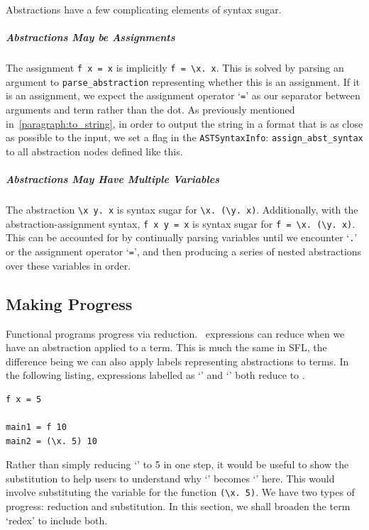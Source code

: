 \noindent Abstractions have a few complicating elements of syntax sugar.

\subparagraph{Abstractions May be Assignments}
The assignment \verb|f x = x| is implicitly \verb|f = \x. x|. This is solved by parsing an argument to \verb|parse_abstraction| representing whether this is an assignment. If it is an assignment, we expect the assignment operator `\verb|=|' as our separator between arguments and term rather than the dot. As previously mentioned in~\ref{paragraph:to_string}, in order to output the string in a format that is as close as possible to the input, we set a flag in the \verb|ASTSyntaxInfo|: \verb|assign_abst_syntax| to all abstraction nodes defined like this. 

\subparagraph{Abstractions May Have Multiple Variables}
The abstraction \verb|\x y. x| is syntax sugar for \newline\noindent\verb|\x. (\y. x)|. Additionally, with the abstraction-assignment syntax, \verb|f x y = x| is syntax sugar for \newline\noindent\verb|f = \x. (\y. x)|. This can be accounted for by continually parsing variables until we encounter `\verb|.|' or the assignment operator `\verb|=|', and then producing a series of nested abstractions over these variables in order. 

\subsection{Making Progress}
\label{c1_design_reduction_progress}
Functional programs progress via reduction. \lcalc\ expressions can reduce when we have an abstraction applied to a term. This is much the same in \ac{SFL}, the difference being we can also apply labels representing abstractions to terms. In the following listing, expressions labelled as `' and `' both reduce to . 
\begin{lstlisting}[language=SFL]
f x = 5

main1 = f 10 
main2 = (\x. 5) 10
\end{lstlisting}
\noindent Rather than simply reducing `' to 5 in one step, it would be useful to show the substitution to help users to understand why `' becomes `' here. This would involve substituting the variable  for the function \verb|(\x. 5)|. We have two types of progress: reduction and substitution. In this section, we shall broaden the term `redex' to include both. 

